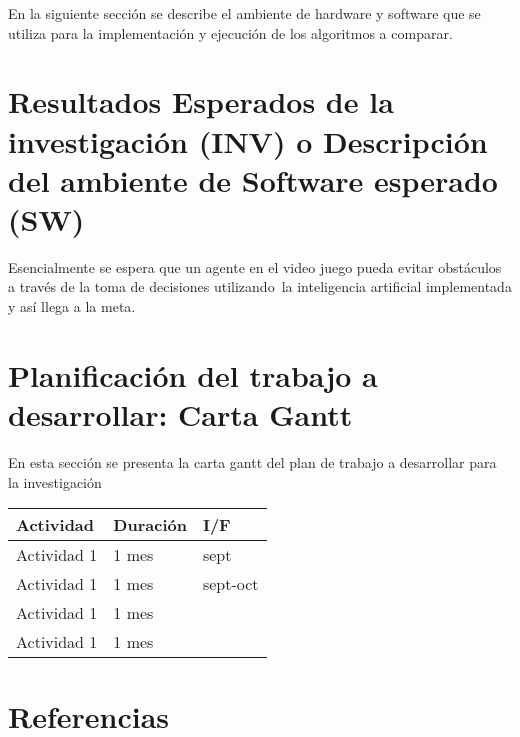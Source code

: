 \documentclass[spanish]{article}
\begin{document}
	En la siguiente sección se describe el ambiente de hardware y software que se utiliza para la implementación y ejecución de los algoritmos a comparar.



\section{Resultados Esperados de la investigación (INV) o Descripción del ambiente de Software esperado (SW)}

Esencialmente se espera que un agente en el video juego pueda evitar obstáculos a través de la toma de decisiones utilizando\
la inteligencia artificial implementada y así llega a la meta.

\section{Planificación del trabajo a desarrollar: Carta Gantt}

	En esta sección se presenta la carta gantt del plan de trabajo a desarrollar para la investigación

\begin{table}[H]
\centering
\begin{tabular}{|l|l|l|}
\hline
\textbf{Actividad}      & \textbf{Duración} & \textbf{I/F} \\ \hline
Actividad 1             & 1 mes            &  sept\\ \hline
Actividad 1             & 1 mes            &  sept-oct\\ \hline
Actividad 1             & 1 mes            &  \\ \hline
Actividad 1             & 1 mes             & \\ \hline
\end{tabular}%
\end{table}

\section{Referencias}


\end{document}
